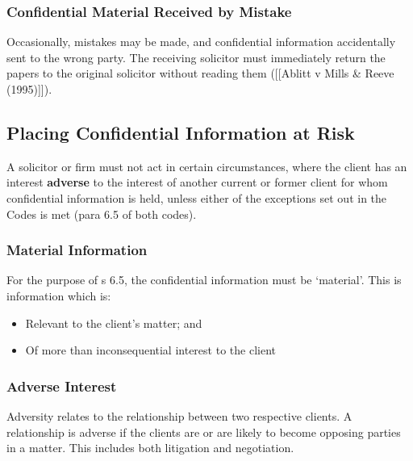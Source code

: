 \documentclass[
]{article}
\providecommand{\tightlist}{%
  \setlength{\itemsep}{0pt}\setlength{\parskip}{0pt}}
\begin{document}
\hypertarget{confidential-material-received-by-mistake}{%
\subsubsection{Confidential Material Received by
Mistake}\label{confidential-material-received-by-mistake}}

Occasionally, mistakes may be made, and confidential information
accidentally sent to the wrong party. The receiving solicitor must
immediately return the papers to the original solicitor without reading
them ({[}{[}Ablitt v Mills \& Reeve (1995){]}{]}).

\hypertarget{placing-confidential-information-at-risk}{%
\subsection{Placing Confidential Information at
Risk}\label{placing-confidential-information-at-risk}}

A solicitor or firm must not act in certain circumstances, where the
client has an interest \textbf{adverse} to the interest of another
current or former client for whom confidential information is held,
unless either of the exceptions set out in the Codes is met (para 6.5 of
both codes).

\hypertarget{material-information}{%
\subsubsection{Material Information}\label{material-information}}

For the purpose of s 6.5, the confidential information must be
`material'. This is information which is:

\begin{itemize}
\tightlist
\item
  Relevant to the client's matter; and
\item
  Of more than inconsequential interest to the client
\end{itemize}

\hypertarget{adverse-interest}{%
\subsubsection{Adverse Interest}\label{adverse-interest}}

Adversity relates to the relationship between two respective clients. A
relationship is adverse if the clients are or are likely to become
opposing parties in a matter. This includes both litigation and
negotiation.
\end{document}
